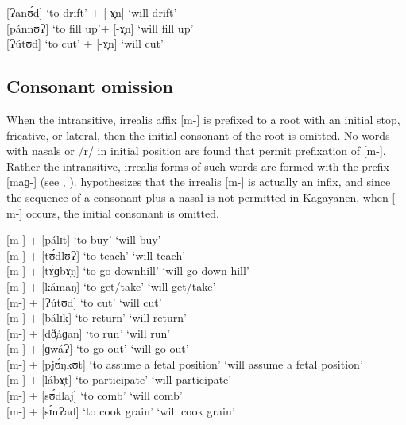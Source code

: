 \ea
{}[Ɂanʊ́d] ‘to drift’ + [-ɤ̞n] \rightarrow [Ɂanúɾʊn] ‘will drift’ \\
{}[pánnʊɁ] ‘to fill up’+ [-ɤ̞n] \rightarrow [pannúɁʊn] ‘will fill up’ \\
{}[Ɂútʊd] ‘to cut’ + [-ɤ̞n] \rightarrow [Ɂutúɾʊn] ‘will cut’
\z

\subsection{Consonant omission}\label{consonant-deletion}

When the intransitive, irrealis affix [m-] is prefixed to a root with an initial stop, fricative, or lateral, then the initial consonant of the root is omitted. No words with nasals or /r/ in initial position are found that permit prefixation of [m-]. Rather the intransitive, irrealis forms of such words are formed with the prefix [maɡ-] (see , ). \citet[29]{harmon1977} hypothesizes that the irrealis [m-] is actually an infix, and since the sequence of a consonant plus a nasal is not permitted in Kagayanen, when [-m-] occurs, the initial consonant is omitted.


\ea
{}[m-] + [pálɪt] ‘to buy’  \rightarrow [málɪt] ‘will buy’ \\
{}[m-] + [tʊ́dlʊɁ] ‘to teach’ \rightarrow [mʊ́dlʊɁ] ‘will teach’ \\
{}[m-] + [tɤ̞́ɡbɤ̞ŋ] ‘to go downhill’ \rightarrow [mɤ̞́ɡbɤ̞ŋ] ‘will go down hill’ \\
{}[m-] + [kámaŋ] ‘to get/take’  \rightarrow [mámaŋ] ‘will get/take’ \\
{}[m-] + [Ɂútʊd] ‘to cut’  \rightarrow [mútʊd] ‘will cut’ \\
{}[m-] + [bálɪk] ‘to return’ \rightarrow [málɪk] ‘will return’ \\
{}[m-] + [dð̞áɡan] ‘to run’  \rightarrow [mð̞áɡan] ‘will run’ \\
{}[m-] + [ɡwáɁ] ‘to go out’ \rightarrow [mwaɁ] ‘will go out’ \\
{}[m-] + [pjʊ́ŋkʊt] ‘to assume a fetal position’  ‘will assume a fetal position’ \\
{}[m-] + [lábɤ̞t] ‘to participate’ \rightarrow [mábɤ̞t] ‘will participate’ \\
{}[m-] + [sʊ́dlaj] ‘to comb’ \rightarrow [mʊ́dlaj] ‘will comb’ \\
{}[m-] + [sɪ́nɁad] ‘to cook grain’ \rightarrow [mɪ́nɁad] ‘will cook grain’
\z

